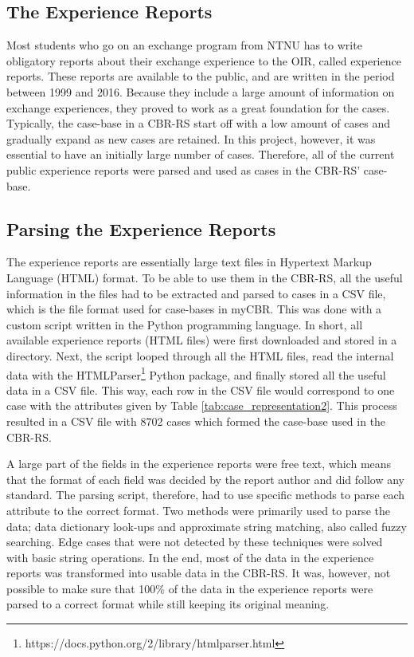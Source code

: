 \subsection{The Experience Reports}\label{sec:experience_reports}
Most students who go on an exchange program from NTNU has to write obligatory reports about their exchange experience to the OIR, called experience reports. These reports are available to the public, and are written in the period between 1999 and 2016. Because they include a large amount of information on exchange experiences, they proved to work as a great foundation for the cases. Typically, the case-base in a CBR-RS start off with a low amount of cases and gradually expand as new cases are retained. In this project, however, it was essential to have an initially large number of cases. Therefore, all of the current public experience reports were parsed and used as cases in the CBR-RS' case-base. 

\subsection{Parsing the Experience Reports}\label{sec:parsing_experience_reports}

The experience reports are essentially large text files in Hypertext Markup Language (HTML) format. To be able to use them in the CBR-RS, all the useful information in the files had to be extracted and parsed to cases in a CSV file, which is the file format used for case-bases in myCBR. This was done with a custom script written in the Python programming language. In short, all available experience reports (HTML files) were first downloaded and stored in a directory. Next, the script looped through all the HTML files, read the internal data with the HTMLParser\footnote{https://docs.python.org/2/library/htmlparser.html} Python package, and finally stored all the useful data in a CSV file. This way, each row in the CSV file would correspond to one case with the attributes given by Table \ref{tab:case_representation2}. This process resulted in a CSV file with 8702 cases which formed the case-base used in the CBR-RS.

A large part of the fields in the experience reports were free text, which means that the format of each field was decided by the report author and did follow any standard. The parsing script, therefore, had to use specific methods to parse each attribute to the correct format. Two methods were primarily used to parse the data; data dictionary look-ups and approximate string matching, also called fuzzy searching. Edge cases that were not detected by these techniques were solved with basic string operations. In the end, most of the data in the experience reports was transformed into usable data in the CBR-RS. It was, however, not possible to make sure that 100\% of the data in the experience reports were parsed to a correct format while still keeping its original meaning.

